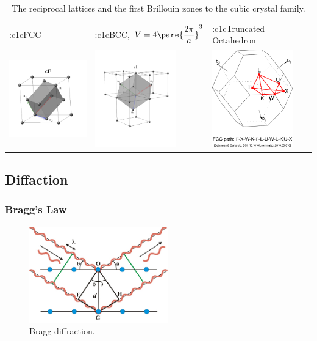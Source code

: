 \documentclass[hidelinks]{article}
\begin{document}
\begin{table}[htp]
\begin{tabular}{m{3.5cm}m{3.8cm}m{3.8cm}}
        \hline
        \+:c1c{FCC} & \+:c1c{BCC,\ $V = 4\pare{\dfrac{2\pi}{a}}^3$} & \+:c1c{Truncated Octahedron} \\
        \includegraphics[width=3.5cm]{src/FCC.png} & \includegraphics[width=3.5cm]{src/BCC.png} & \includegraphics[width=3.5cm]{src/FCCBZ.png} \\
        \hline
    \end{tabular}
    \caption{The reciprocal lattices and the first Brillouin zones to the cubic crystal family.}
    \label{table:cubic_crystal_family}
\end{table}



\subsection{Diffaction} %
\label{sub:diffaction}

\subsubsection{Bragg's Law} %
\label{ssub:bragg_s_law}

\begin{figure}[ht]
    \centering
    \includegraphics[width=6cm]{src/bragg.jpg}
    \caption{Bragg diffraction.}
    \label{fig:bragg_diffraction}
\end{figure}
\end{document}
